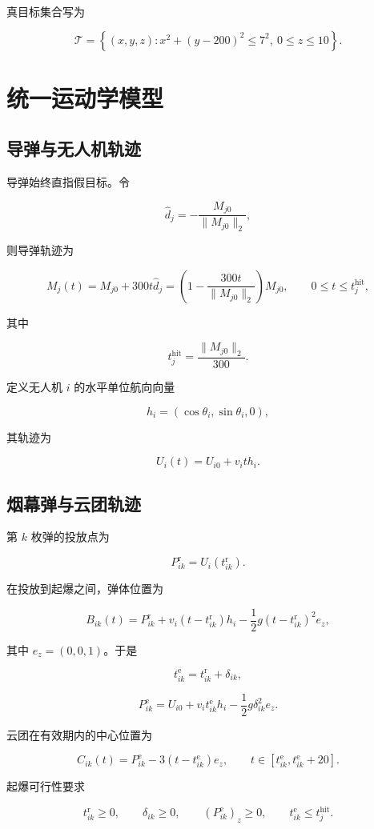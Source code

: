 真目标集合写为

\[
\mathcal T=\left\{(x,y,z):x^2+(y-200)^2\le 7^2,\ 0\le z\le10\right\}.
\]

\section{统一运动学模型}

\subsection{导弹与无人机轨迹}

导弹始终直指假目标。令

\[
\hat d_j=-\frac{M_{j0}}{\|M_{j0}\|_2},
\]

则导弹轨迹为

\[
M_j(t)=M_{j0}+300t\hat d_j
=\left(1-\frac{300t}{\|M_{j0}\|_2}\right)M_{j0},
\qquad 0\le t\le t_j^{\mathrm{hit}},
\]

其中

\[
t_j^{\mathrm{hit}}=\frac{\|M_{j0}\|_2}{300}.
\]

定义无人机 $i$ 的水平单位航向向量

\[
h_i=(\cos\theta_i,\sin\theta_i,0),
\]

其轨迹为

\[
U_i(t)=U_{i0}+v_it h_i.
\]

\subsection{烟幕弹与云团轨迹}

第 $k$ 枚弹的投放点为

\[
P_{ik}^{\mathrm r}=U_i(t_{ik}^{\mathrm r}).
\]

在投放到起爆之间，弹体位置为

\[
B_{ik}(t)=P_{ik}^{\mathrm r}
+v_i(t-t_{ik}^{\mathrm r})h_i
-\frac12g(t-t_{ik}^{\mathrm r})^2e_z,
\]

其中 $e_z=(0,0,1)$。于是

\[
t_{ik}^{\mathrm e}=t_{ik}^{\mathrm r}+\delta_{ik},
\]

\[
P_{ik}^{\mathrm e}=U_{i0}+v_it_{ik}^{\mathrm e}h_i
-\frac12g\delta_{ik}^2e_z.
\]

云团在有效期内的中心位置为

\[
C_{ik}(t)=P_{ik}^{\mathrm e}-3(t-t_{ik}^{\mathrm e})e_z,
\qquad t\in[t_{ik}^{\mathrm e},t_{ik}^{\mathrm e}+20].
\]

起爆可行性要求

\[
t_{ik}^{\mathrm r}\ge0,\qquad \delta_{ik}\ge0,\qquad
(P_{ik}^{\mathrm e})_z\ge0,\qquad
t_{ik}^{\mathrm e}\le t_j^{\mathrm{hit}}.
\]

